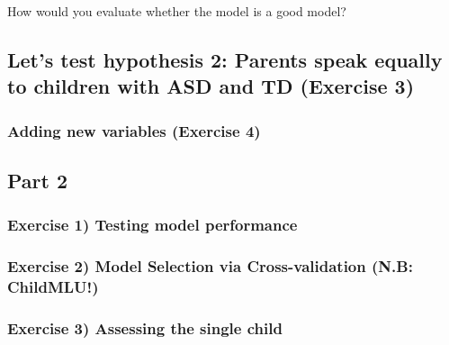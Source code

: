 \documentclass[]{article}
\begin{document}
How would you evaluate whether the model is a good model?

\subsection{Let's test hypothesis 2: Parents speak equally to children
with ASD and TD (Exercise
3)}\label{lets-test-hypothesis-2-parents-speak-equally-to-children-with-asd-and-td-exercise-3}

\subsubsection{Adding new variables (Exercise
4)}\label{adding-new-variables-exercise-4}

\subsection{Part 2}\label{part-2}

\subsubsection{Exercise 1) Testing model
performance}\label{exercise-1-testing-model-performance}

\subsubsection{Exercise 2) Model Selection via Cross-validation (N.B:
ChildMLU!)}\label{exercise-2-model-selection-via-cross-validation-n.b-childmlu}

\subsubsection{Exercise 3) Assessing the single
child}\label{exercise-3-assessing-the-single-child}
\end{document}
